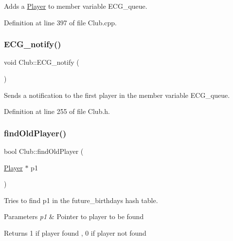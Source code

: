Adds a \hyperlink{class_player}{Player} to member variable E\+C\+G\+\_\+queue. 



Definition at line 397 of file Club.\+cpp.

\hypertarget{class_club_aad02197c0f3431dbe8c2e12033e24f63}{}\label{class_club_aad02197c0f3431dbe8c2e12033e24f63} 
\subsubsection{\texorpdfstring{E\+C\+G\+\_\+notify()}{ECG\_notify()}}
{\footnotesize\ttfamily void Club\+::\+E\+C\+G\+\_\+notify (\begin{DoxyParamCaption}{ }\end{DoxyParamCaption})\hspace{0.3cm}{\ttfamily [inline]}}



Sends a notification to the first player in the member variable E\+C\+G\+\_\+queue. 



Definition at line 255 of file Club.\+h.

\hypertarget{class_club_aefc39e233faadeb0463e959628ab4a0d}{}\label{class_club_aefc39e233faadeb0463e959628ab4a0d} 
\subsubsection{\texorpdfstring{find\+Old\+Player()}{findOldPlayer()}}
{\footnotesize\ttfamily bool Club\+::find\+Old\+Player (\begin{DoxyParamCaption}\item[{\hyperlink{class_player}{Player} $\ast$}]{p1 }\end{DoxyParamCaption})}



Tries to find p1 in the future\+\_\+birthdays hash table. 


\begin{DoxyParams}{Parameters}
{\em p1} & Pointer to player to be found \\
\hline
\end{DoxyParams}
\begin{DoxyReturn}{Returns}
1 if player found , 0 if player not found 
\end{DoxyReturn}


